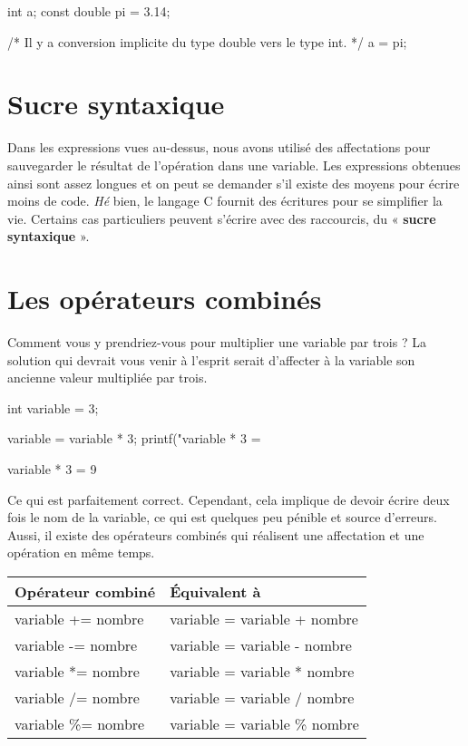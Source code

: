 \begin{C}
int a;
const double pi = 3.14;

/* Il y a conversion implicite du type double vers le type int. */
a = pi;
\end{C}

\section{Sucre syntaxique }
\label{sucre-syntaxique}

Dans les expressions vues au-dessus, nous avons utilisé des affectations pour
sauvegarder le résultat de l'opération dans une variable. Les
expressions obtenues ainsi sont assez longues et on peut se demander
s'il existe des moyens pour écrire moins de code. \emph{Hé} bien, le
langage C fournit des écritures pour se simplifier la vie. Certains cas
particuliers peuvent s'écrire avec des raccourcis, du « \textbf{sucre
syntaxique} ».

\section{Les opérateurs combinés}
\label{les-operateurs-combines}

Comment vous y prendriez-vous pour multiplier une variable par trois ?
La solution qui devrait vous venir à l'esprit serait d'affecter à la
variable son ancienne valeur multipliée par trois.

\begin{C}
int variable = 3;

variable = variable * 3;
printf("variable * 3 = %
\end{C}

\begin{C}
variable * 3 = 9
\end{C}

Ce qui est parfaitement correct. Cependant, cela implique de devoir
écrire deux fois le nom de la variable, ce qui est quelques peu pénible
et source d'erreurs. Aussi, il existe des opérateurs combinés qui
réalisent une affectation et une opération en même temps.

\begin{table}[ht!]
\centering
 \begin{tabular}{|l|l|}\hline
\rowcolor{gris-tab-entete}\textbf{Opérateur combiné} & \textbf{Équivalent à}\tabularnewline\hline
variable += nombre & variable = variable + nombre\tabularnewline\hline
\rowcolor{gris-clair-tab}variable -= nombre & variable = variable - nombre\tabularnewline\hline
variable *= nombre & variable = variable * nombre\tabularnewline\hline
\rowcolor{gris-clair-tab}variable /= nombre & variable = variable / nombre\tabularnewline\hline
variable \%= nombre & variable = variable \% nombre\tabularnewline\hline
 \end{tabular}
\end{table}


